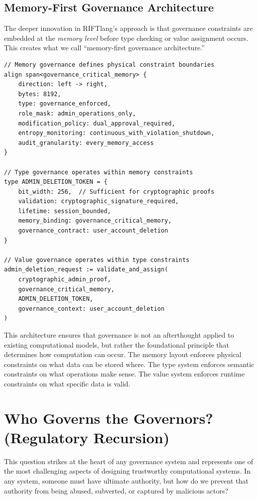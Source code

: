 \subsection{Memory-First Governance Architecture}

The deeper innovation in RIFTlang's approach is that governance constraints are embedded at the \textit{memory level} before type checking or value assignment occurs. This creates what we call ``memory-first governance architecture.''

\begin{lstlisting}[language=rift, caption=Memory-First Governance Constraints]
// Memory governance defines physical constraint boundaries
align span<governance_critical_memory> {
    direction: left -> right,
    bytes: 8192,
    type: governance_enforced,
    role_mask: admin_operations_only,
    modification_policy: dual_approval_required,
    entropy_monitoring: continuous_with_violation_shutdown,
    audit_granularity: every_memory_access
}

// Type governance operates within memory constraints
type ADMIN_DELETION_TOKEN = {
    bit_width: 256,  // Sufficient for cryptographic proofs
    validation: cryptographic_signature_required,
    lifetime: session_bounded,
    memory_binding: governance_critical_memory,
    governance_contract: user_account_deletion
}

// Value governance operates within type constraints  
admin_deletion_request := validate_and_assign(
    cryptographic_admin_proof,
    governance_critical_memory,
    ADMIN_DELETION_TOKEN,
    governance_context: user_account_deletion
)
\end{lstlisting}

This architecture ensures that governance is not an afterthought applied to existing computational models, but rather the foundational principle that determines how computation can occur. The memory layout enforces physical constraints on what data can be stored where. The type system enforces semantic constraints on what operations make sense. The value system enforces runtime constraints on what specific data is valid.

\section{Who Governs the Governors? (Regulatory Recursion)}

This question strikes at the heart of any governance system and represents one of the most challenging aspects of designing trustworthy computational systems. In any system, someone must have ultimate authority, but how do we prevent that authority from being abused, subverted, or captured by malicious actors?

